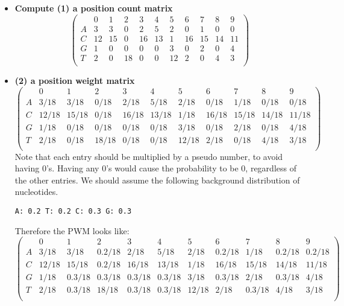 \documentclass[a4paper,10pt,titlepage]{article}
\begin{document}
\begin{itemize}
\item
\textbf{Compute (1) a position count matrix} \\
\begin{equation}
  \begin{pmatrix}
	  & 0  & 1  & 2  & 3  & 4  & 5  & 6  & 7  & 8  & 9 \\
	\hline
	A & 3  & 3  & 0  & 2  & 5  & 2  & 0  & 1  & 0  & 0 \\
	C & 12 & 15 & 0  & 16 & 13 & 1  & 16 & 15 & 14 & 11\\
	G & 1  & 0  & 0  & 0  & 0  & 3  & 0  & 2  & 0  & 4 \\
	T & 2  & 0  & 18 & 0  & 0  & 12 & 2  & 0  & 4  & 3 \\
  \end{pmatrix}
\end{equation}

\item
\textbf{(2) a position weight matrix} \\
\begin{equation}
  \begin{pmatrix}
	  & 0  & 1  & 2  & 3  & 4  & 5  & 6  & 7  & 8  & 9 \\
	\hline
	A & 3/18  & 3/18  & 0/18  & 2/18  & 5/18  & 2/18  & 0/18  & 1/18  & 0/18  & 0/18 \\
	C & 12/18 & 15/18 & 0/18  & 16/18 & 13/18 & 1/18  & 16/18 & 15/18 & 14/18 & 11/18\\
	G & 1/18  & 0/18  & 0/18  & 0/18  & 0/18  & 3/18  & 0/18  & 2/18  & 0/18  & 4/18 \\
	T & 2/18  & 0/18  & 18/18 & 0/18  & 0/18  & 12/18 & 2/18  & 0/18  & 4/18  & 3/18 \\
  \end{pmatrix}
\end{equation}
Note that each entry should be multiplied by a pseudo number, to avoid having 0's. Having any 0's would cause the probability to be 0, regardless of the other entries.
We should assume the following background distribution of nucleotides.
\begin{verbatim}
A: 0.2 T: 0.2 C: 0.3 G: 0.3
\end{verbatim}
Therefore the PWM looks like:
\begin{equation}
  \begin{pmatrix}
	  & 0  & 1  & 2  & 3  & 4  & 5  & 6  & 7  & 8  & 9 \\
	\hline
	A & 3/18  & 3/18  & 0.2/18  & 2/18  & 5/18  & 2/18  & 0.2/18  & 1/18  & 0.2/18  & 0.2/18 \\
	C & 12/18 & 15/18 & 0.2/18  & 16/18 & 13/18 & 1/18  & 16/18 & 15/18 & 14/18 & 11/18\\
	G & 1/18  & 0.3/18  & 0.3/18  & 0.3/18  & 0.3/18  & 3/18  & 0.3/18  & 2/18  & 0.3/18  & 4/18 \\
	T & 2/18  & 0.3/18  & 18/18 & 0.3/18  & 0.3/18  & 12/18 & 2/18  & 0.3/18  & 4/18  & 3/18 \\
  \end{pmatrix}
\end{equation}

\end{itemize}
\end{document}

